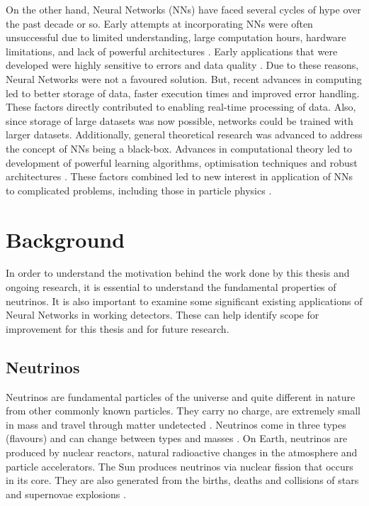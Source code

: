 On the other hand, Neural Networks (NNs) have faced several cycles of hype over the past decade or so. Early attempts at incorporating NNs were often unsuccessful due to limited understanding, large computation hours, hardware limitations, and lack of powerful architectures \cite{ahmed1974discrete}. Early applications that were developed were highly sensitive to errors and data quality \cite{ahmed1974discrete}. Due to these reasons, Neural Networks were not a favoured solution. But, recent advances in computing led to better storage of data, faster execution times and improved error handling. These factors directly contributed to enabling real-time processing of data. Also, since storage of large datasets was now possible, networks could be trained with larger datasets. Additionally, general theoretical research was advanced to address the concept of NNs being a black-box. Advances in computational theory led to development of powerful learning algorithms, optimisation techniques and robust architectures \cite{bottou2010large}. These factors combined led to new interest in application of NNs to complicated problems, including those in particle physics \cite{edelen2016neural}.

\section{Background} 
In order to understand the motivation behind the work done by this thesis and ongoing research, it is essential to understand the fundamental properties of neutrinos. It is also important to examine some significant existing applications of Neural Networks in working detectors. These can help identify scope for improvement for this thesis and for future research.

\subsection{Neutrinos}
Neutrinos are fundamental particles of the universe and quite different in nature from other commonly known particles. They carry no charge, are extremely small in mass and travel through matter undetected \cite{bilenky2013neutrino}. Neutrinos come in three types (flavours) and can change between types and masses \cite{bilenky2013neutrino}. On Earth, neutrinos are produced by nuclear reactors, natural radioactive changes in the atmosphere and particle accelerators. The Sun produces neutrinos via nuclear fission that occurs in its core. They are also generated from the births, deaths and collisions of stars and supernovae explosions \cite{roberts1992birth}. 

